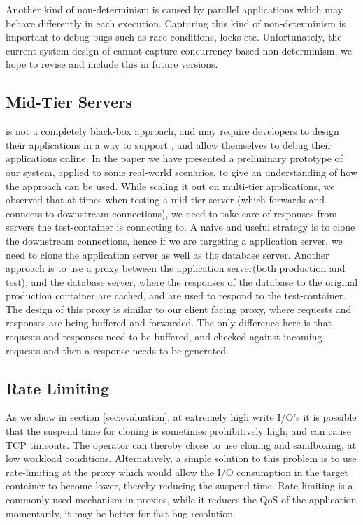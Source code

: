 Another kind of non-determinism is caused by parallel applications which may behave differently in each execution.
Capturing this kind of non-determinism is important to debug bugs such as race-conditions, locks etc.
Unfortunately, the current system design of \parikshan cannot capture concurrency based non-determinism, we hope to revise and include this in future versions.

\subsection{Mid-Tier Servers}
\label{sec:midTier}

\parikshan is not a completely black-box approach, and may require developers to design their applications in a way to support \parikshan, and allow themselves to debug their applications online.
In the paper we have presented a preliminary prototype of our system, applied to some real-world scenarios, to give an understanding of how the approach can be used.
While scaling it out on multi-tier applications, we observed that at times when testing a mid-tier server (which forwards and connects to downstream connections), we need to take care of responses from servers the test-container is connecting to.
A naive and useful strategy is to clone the downstream connections, hence if we are targeting a application server, we need to clone the application server as well as the database server.
Another approach is to use a proxy between the application server(both production and test), and the database server, where the responses of the database to the original production container are cached, and are used to respond to the test-container.
The design of this proxy is similar to our client facing proxy, where requests and responses are being buffered and forwarded. The only difference here is that requests and responses need to be buffered, and checked against incoming requests and then a response needs to be generated. 

\subsection{Rate Limiting}
\label{sec:ratelimiting}

As we show in section \ref{sec:evaluation}, at extremely high write I/O's it is possible that the suspend time for cloning is sometimes prohibitively high, and can cause TCP timeouts. 
The operator can thereby chose to use cloning and sandboxing, at low workload conditions. 
Alternatively, a simple solution to this problem is to use rate-limiting at the proxy which would allow the I/O consumption in the target container to become lower, thereby reducing the suspend time.
Rate limiting is a commonly used mechanism in proxies, while it reduces the QoS of the application momentarily, it may be better for fast bug resolution.

